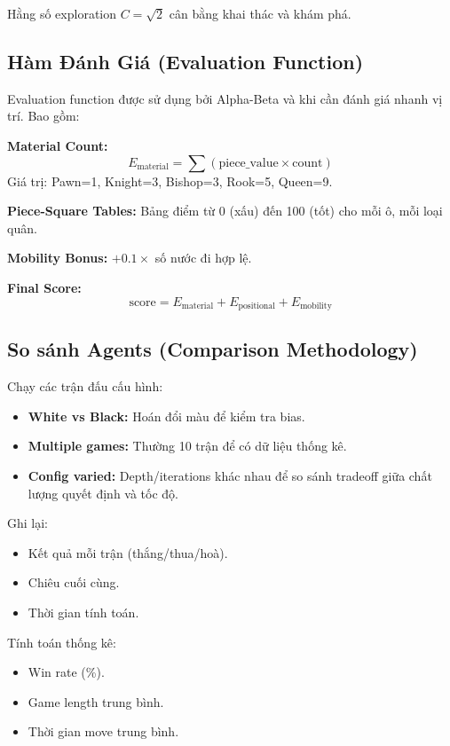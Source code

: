 Hằng số exploration $C = \sqrt{2}$ cân bằng khai thác và khám phá.

\subsection{Hàm Đánh Giá (Evaluation Function)}
Evaluation function được sử dụng bởi Alpha-Beta và khi cần đánh giá nhanh vị trí. Bao gồm:

\textbf{Material Count:}
\[E_{\text{material}} = \sum (\text{piece\_value} \times \text{count})\]
Giá trị: Pawn=1, Knight=3, Bishop=3, Rook=5, Queen=9.

\textbf{Piece-Square Tables:} Bảng điểm từ 0 (xấu) đến 100 (tốt) cho mỗi ô, mỗi loại quân.

\textbf{Mobility Bonus:} $+0.1 \times$ số nước đi hợp lệ.

\textbf{Final Score:}
\[\text{score} = E_{\text{material}} + E_{\text{positional}} + E_{\text{mobility}}\]

\subsection{So sánh Agents (Comparison Methodology)}
Chạy các trận đấu cấu hình:
\begin{itemize}
    \item \textbf{White vs Black:} Hoán đổi màu để kiểm tra bias.
    \item \textbf{Multiple games:} Thường 10 trận để có dữ liệu thống kê.
    \item \textbf{Config varied:} Depth/iterations khác nhau để so sánh tradeoff giữa chất lượng quyết định và tốc độ.
\end{itemize}

Ghi lại:
\begin{itemize}
    \item Kết quả mỗi trận (thắng/thua/hoà).
    \item Chiêu cuối cùng.
    \item Thời gian tính toán.
\end{itemize}

Tính toán thống kê:
\begin{itemize}
    \item Win rate (\%).
    \item Game length trung bình.
    \item Thời gian move trung bình.
\end{itemize}


